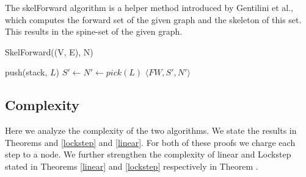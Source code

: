 \documentclass[../master/master.tex]{subfiles}
\begin{document}
The skelForward algorithm is a helper method introduced by Gentilini et al., which computes the forward set of the given graph and the skeleton of this set. This results in the spine-set of the given graph.

\begin{algorithm}[H]
  \caption{SkelForward((V, E), N)}
  \begin{algorithmic}[1]
    \Statex
    \State push(stack, $L$)
    \EndWhile
    \Statex
    \State $S' \gets N' \gets pick(L)$
    \EndWhile
    \Statex
    \State \Return $\langle FW, S', N' \rangle$
  \end{algorithmic}
\end{algorithm}
\subsection{Complexity}
Here we analyze the complexity of the two algorithms. We state the results in Theorems  and \ref{lockstep} and \ref{linear}. For both of these proofs we charge each step to a node. We further strengthen the complexity of linear and Lockstep stated in Theorems \ref{linear} and \ref{lockstep} respectively in Theorem \label{linear-strengthened}.
\end{document}
